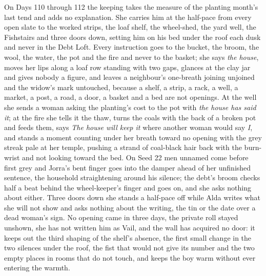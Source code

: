 \documentclass{design/chronicle}
\begin{document}
{On Days 110 through 112 the keeping takes the measure of the planting month’s last tend and adds no explanation. She carries him at the half-pace from every open slate to the worked strips, the loaf shelf, the wheel-shed, the yard well, the Fishstairs and three doors down, setting him on his bed under the roof each dusk and never in the Debt Loft. Every instruction goes to the bucket, the broom, the wool, the water, the pot and the fire and never to the basket; she says \emph{the house}, moves her lips along a loaf row standing with two gaps, glances at the clay jar and gives nobody a figure, and leaves a neighbour’s one-breath joining unjoined and the widow’s mark untouched, because a shelf, a strip, a rack, a well, a market, a post, a road, a door, a basket and a bed are not openings. At the well she sends a woman asking the planting’s cost to the pot with \emph{the house has said it}; at the fire she tells it the thaw, turns the coals with the back of a broken pot and feeds them, says \emph{The house will keep it} where another woman would say \emph{I}, and stands a moment counting under her breath toward no opening with the grey streak pale at her temple, pushing a strand of coal-black hair back with the burn-wrist and not looking toward the bed. On Seed 22 men unnamed come before first grey and Jorra’s bent finger goes into the damper ahead of her unfinished sentence, the household straightening around his silence; the debt’s broom checks half a beat behind the wheel-keeper’s finger and goes on, and she asks nothing about either. Three doors down she stands a half-pace off while Alda writes what she will not show and asks nothing about the writing, the tin or the date over a dead woman’s sign. No opening came in three days, the private roll stayed unshown, she has not written him as Vail, and the wall has acquired no door: it keeps out the third shaping of the shelf’s absence, the first small change in the two silences under the roof, the fist that would not give its number and the two empty places in rooms that do not touch, and keeps the boy warm without ever entering the warmth.

}
\end{document}
